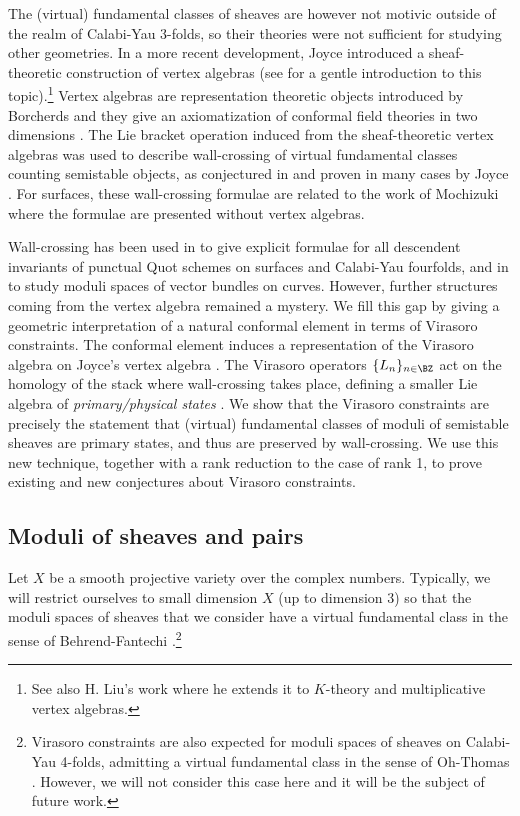 The (virtual) fundamental classes of sheaves are however not motivic outside of the realm of Calabi-Yau 3-folds, so their theories were not sufficient for studying other geometries. In a more recent development, Joyce \cite{Jo17} introduced a sheaf-theoretic construction of vertex algebras (see \cite{Borcherds,Ka98,LLVA} for a gentle introduction to this topic).\footnote{See also H. Liu's work \cite{Liu} where he extends it to $K$-theory and multiplicative vertex algebras.} Vertex algebras are representation theoretic objects introduced by Borcherds \cite{Borcherds} and they give an axiomatization of conformal field theories in two dimensions \cite{BPZ}. The Lie bracket operation induced from the sheaf-theoretic vertex algebras was used to describe wall-crossing of virtual fundamental classes counting semistable objects, as conjectured in \cite{GJT} and proven in many cases by Joyce \cite{Jo21}. For surfaces, these wall-crossing formulae are related to the work of Mochizuki \cite{mochizuki} where the formulae are presented without vertex algebras.

Wall-crossing has been used in \cite{Bo21.5,Bo21} to give explicit formulae for all descendent invariants of punctual Quot schemes on surfaces and Calabi-Yau fourfolds, and in \cite{Bu22} to study moduli spaces of vector bundles on curves. However, further structures coming from the vertex algebra remained a mystery. We fill this gap by giving a geometric interpretation of a natural conformal element in terms of Virasoro constraints. The conformal element  induces a representation of the Virasoro algebra on Joyce's vertex algebra \cite{Jo17}. The Virasoro operators $\{L_n\}_{n\in \BZ}$ act on the homology of the stack where wall-crossing takes place, defining a smaller Lie algebra of \textit{primary/physical states} \cite{BPZ,Borcherds}. We show that the Virasoro constraints are precisely the statement that (virtual) fundamental classes of moduli of semistable sheaves are primary states, and thus are preserved by wall-crossing. We use this new technique, together with a rank reduction to the case of rank 1, to prove existing and new conjectures about Virasoro constraints.


\subsection{Moduli of sheaves and pairs}
\label{sec: modulisheavespairs}

Let $X$ be a smooth projective variety over the complex numbers. Typically, we will restrict ourselves to small dimension $X$ (up to dimension 3) so that the moduli spaces of sheaves that we consider have a virtual fundamental class in the sense of Behrend-Fantechi \cite{BF}.\footnote{Virasoro constraints are also expected for moduli spaces of sheaves on Calabi-Yau 4-folds, admitting a virtual fundamental class in the sense of Oh-Thomas \cite{OT}. However, we will not consider this case here and it will be the subject of future work.}

